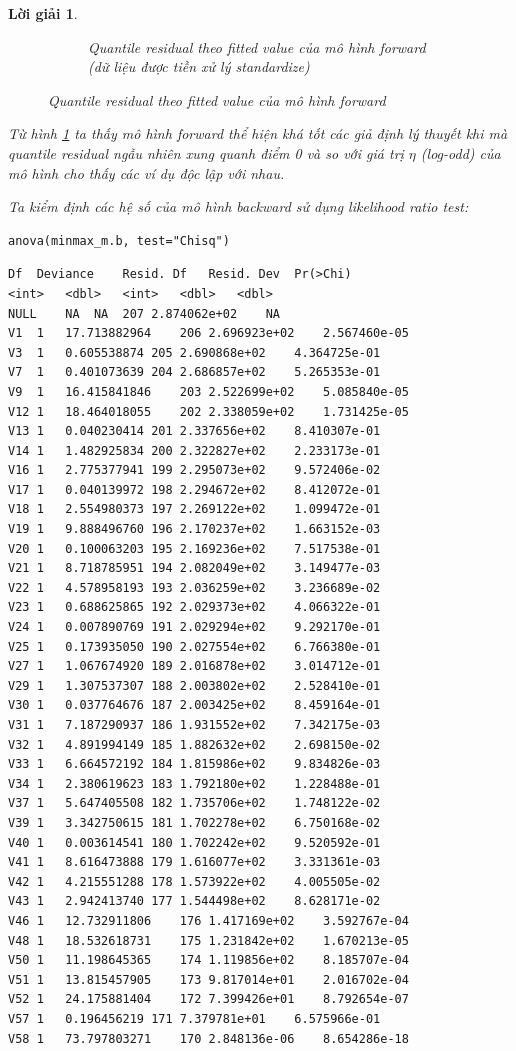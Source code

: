 \documentclass[14pt, a4paper]{article}
\theoremstyle{sltheorem}
\theoremstyle{soltheorem}
\newtheorem*{loigiai}{Lời giải}
\begin{document}
\begin{loigiai}
\begin{figure}[h!]
\begin{subfigure}[b]{0.4\textwidth}
            \caption{Quantile residual theo fitted value của mô hình forward (dữ liệu được tiền xử lý standardize)}
        \end{subfigure}
        \caption{Quantile residual theo fitted value của mô hình forward}
        \label{fig:Quantile-fitted-mf}
    \end{figure}

    Từ hình \ref{fig:Quantile-fitted-mf} ta thấy mô hình forward thể hiện khá tốt các giả định lý
    thuyết khi mà quantile residual ngẫu nhiên xung quanh điểm 0 và so với giá trị $\eta$ (log-odd) của mô
    hình cho thấy các ví dụ độc lập với nhau.

    Ta kiểm định các hệ số của mô hình backward sử dụng likelihood ratio test:

    \begin{verbatim}
anova(minmax_m.b, test="Chisq")
    \end{verbatim}

    \begin{verbatim}
Df	Deviance	Resid. Df	Resid. Dev	Pr(>Chi)
<int>	<dbl>	<int>	<dbl>	<dbl>
NULL	NA	NA	207	2.874062e+02	NA
V1	1	17.713882964	206	2.696923e+02	2.567460e-05
V3	1	0.605538874	205	2.690868e+02	4.364725e-01
V7	1	0.401073639	204	2.686857e+02	5.265353e-01
V9	1	16.415841846	203	2.522699e+02	5.085840e-05
V12	1	18.464018055	202	2.338059e+02	1.731425e-05
V13	1	0.040230414	201	2.337656e+02	8.410307e-01
V14	1	1.482925834	200	2.322827e+02	2.233173e-01
V16	1	2.775377941	199	2.295073e+02	9.572406e-02
V17	1	0.040139972	198	2.294672e+02	8.412072e-01
V18	1	2.554980373	197	2.269122e+02	1.099472e-01
V19	1	9.888496760	196	2.170237e+02	1.663152e-03
V20	1	0.100063203	195	2.169236e+02	7.517538e-01
V21	1	8.718785951	194	2.082049e+02	3.149477e-03
V22	1	4.578958193	193	2.036259e+02	3.236689e-02
V23	1	0.688625865	192	2.029373e+02	4.066322e-01
V24	1	0.007890769	191	2.029294e+02	9.292170e-01
V25	1	0.173935050	190	2.027554e+02	6.766380e-01
V27	1	1.067674920	189	2.016878e+02	3.014712e-01
V29	1	1.307537307	188	2.003802e+02	2.528410e-01
V30	1	0.037764676	187	2.003425e+02	8.459164e-01
V31	1	7.187290937	186	1.931552e+02	7.342175e-03
V32	1	4.891994149	185	1.882632e+02	2.698150e-02
V33	1	6.664572192	184	1.815986e+02	9.834826e-03
V34	1	2.380619623	183	1.792180e+02	1.228488e-01
V37	1	5.647405508	182	1.735706e+02	1.748122e-02
V39	1	3.342750615	181	1.702278e+02	6.750168e-02
V40	1	0.003614541	180	1.702242e+02	9.520592e-01
V41	1	8.616473888	179	1.616077e+02	3.331361e-03
V42	1	4.215551288	178	1.573922e+02	4.005505e-02
V43	1	2.942413740	177	1.544498e+02	8.628171e-02
V46	1	12.732911806	176	1.417169e+02	3.592767e-04
V48	1	18.532618731	175	1.231842e+02	1.670213e-05
V50	1	11.198645365	174	1.119856e+02	8.185707e-04
V51	1	13.815457905	173	9.817014e+01	2.016702e-04
V52	1	24.175881404	172	7.399426e+01	8.792654e-07
V57	1	0.196456219	171	7.379781e+01	6.575966e-01
V58	1	73.797803271	170	2.848136e-06	8.654286e-18
    \end{verbatim}


\end{loigiai}
\end{document}
